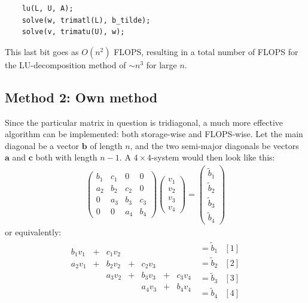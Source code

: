 \documentclass[11pt]{article}
\begin{document}
			\begin{lstlisting}
	lu(L, U, A);
	solve(w, trimatl(L), b_tilde);
	solve(v, trimatu(U), w);
			\end{lstlisting}
			This last bit goes as $O(n^2)$ FLOPS, resulting in a total number of FLOPS for the LU-decomposition method of $\sim n^3$ for large $n$.
		
		
		\subsection{Method 2: Own method}
			Since the particular matrix in question is tridiagonal, a much more effective algorithm can be implemented: both storage-wise and FLOPS-wise. Let the main diagonal be a vector $\mathbf{b}$ of length $n$, and the two semi-major diagonals be vectors $\mathbf{a}$ and $\mathbf{c}$ both with length $n-1$. A $4\times 4$-system would then look like this:
			\begin{align}
				\begin{pmatrix}
					b_1	&	c_1	&	0		&	0		\\
					a_2	&	b_2	&	c_2	&	0		\\
					0		&	a_3	&	b_3	&	c_3	\\
					0		&	0		&	a_4	&	b_4	
				\end{pmatrix}
				\begin{pmatrix}
					v_1	\\	v_2	\\	v_3	\\	v_4
				\end{pmatrix}
				=
				\begin{pmatrix}
					\tilde{b}_1 \\ \tilde{b}_2	\\	\tilde{b}_3	\\	\tilde{b}_4
				\end{pmatrix}
			\end{align}			 
			or equivalently:
			\begin{align*}
				\begin{matrix}
					b_1v_1	&	+	&	c_1v_2		&		&					&		&\\
					a_2v_1	&	+	&	b_2v_2		&	+	&	c_2v_3		&		&\\
								&		&	a_3v_2		&	+	&	b_3v_3		&	+	&	c_3v_4  \\
								&		&					&		&	a_4v_3 	&	+	&	b_4v_4 
				\end{matrix} \
				\begin{matrix}
					= \tilde{b}_1 	&	[1]\\
					= \tilde{b}_2 	&	[2]\\
					= \tilde{b}_3 	&	[3]\\
					= \tilde{b}_4	&	[4]
				\end{matrix}
			\end{align*}
\end{document}
